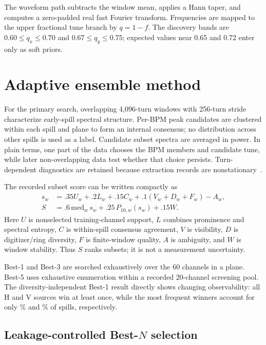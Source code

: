 \documentclass[]{jacow}
\newcommand{\bestn}{Best-$N$}
\begin{document}
The waveform path subtracts the window mean, applies a Hann taper, and computes a zero-padded real fast Fourier transform. Frequencies are mapped to the upper fractional tune branch by $q=1-f$. The discovery bands are $0.60\leq q_x\leq0.70$ and $0.67\leq q_y\leq0.75$; expected values near 0.65 and 0.72 enter only as soft priors.

\section{Adaptive ensemble method}

For the primary search, overlapping 4,096-turn windows with 256-turn stride characterize early-spill spectral structure. Per-BPM peak candidates are clustered within each spill and plane to form an internal consensus; no distribution across other spills is used as a label. Candidate subset spectra are averaged in power. In plain terms, one part of the data chooses the BPM members and candidate tune, while later non-overlapping data test whether that choice persists. Turn-dependent diagnostics are retained because extraction records are nonstationary~\cite{russo:prab2024}.

The recorded subset score can be written compactly as
\begin{align}
s_w &= .35U_w+.2L_w+.15C_w+.1(V_w+D_w+F_w)-A_w,\nonumber\\
S &= .6\,\mathrm{med}_w\,s_w+.25\,P_{10,w}(s_w)+.15W.\nonumber
\end{align}
Here $U$ is nonselected training-channel support, $L$ combines prominence and spectral entropy, $C$ is within-spill consensus agreement, $V$ is visibility, $D$ is digitizer/ring diversity, $F$ is finite-window quality, $A$ is ambiguity, and $W$ is window stability. Thus $S$ ranks subsets; it is not a measurement uncertainty.

Best-1 and Best-3 are searched exhaustively over the 60 channels in a plane. Best-5 uses exhaustive enumeration within a recorded 20-channel screening pool. The diversity-independent Best-1 result directly shows changing observability: all \BestOneUniqueH{} H and \BestOneUniqueV{} V sources win at least once, while the most frequent winners account for only \BestOneMaxFrequencyH{}\% and \BestOneMaxFrequencyV{}\% of spills, respectively.

\subsection{Leakage-controlled \bestn{} selection}
\end{document}
